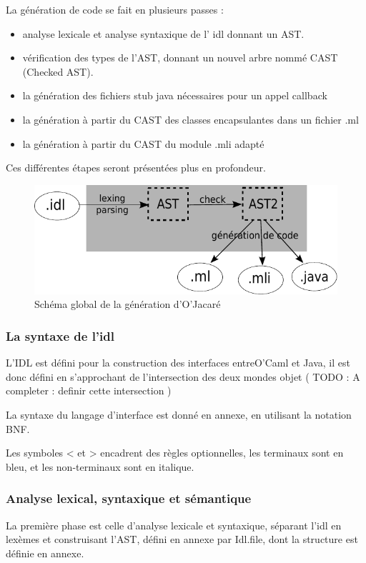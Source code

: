 \documentclass[a4paper, 11pt, notitlepage]{article}
\begin{document}
La génération de code se fait en plusieurs passes :
\begin{itemize}
\item analyse lexicale et analyse syntaxique de l' idl donnant un AST.
\item vérification des types de l'AST, donnant un nouvel arbre nommé
  CAST (Checked AST).
\item la génération des fichiers stub java nécessaires pour un appel callback 
\item la génération à partir du CAST des classes encapsulantes dans un fichier .ml
\item la génération à partir du CAST du module .mli adapté
\end{itemize}
Ces différentes étapes seront présentées plus en profondeur.

\begin{figure}[h]
  \centering
  \includegraphics{schemaOjacare.pdf}
  \caption{Schéma global de la génération d'O'Jacaré}
\end{figure}

\newpage
\subsubsection{La syntaxe de l'idl}
L'IDL est défini pour la construction des interfaces entreO'Caml et
Java, il est donc défini en s'approchant de l'intersection des deux
mondes objet ( TODO : A completer : definir cette intersection )

La syntaxe du langage d'interface est donné en annexe, en utilisant la
notation BNF.

Les symboles < et > encadrent des règles optionnelles,
les terminaux sont en bleu, et les non-terminaux sont en italique.


\subsubsection{Analyse lexical, syntaxique et sémantique}
La première phase est celle d'analyse lexicale et syntaxique,
séparant l'idl en lexèmes et construisant l'AST, défini en annexe par Idl.file,
dont la structure est définie en annexe.
\end{document}
